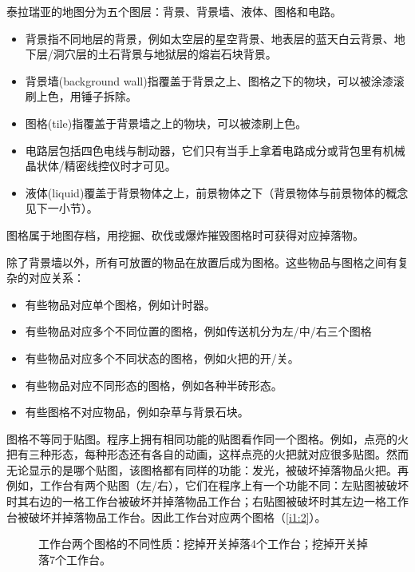 泰拉瑞亚的地图分为五个图层：背景、背景墙、液体、图格和电路。
\begin{itemize}
\item 背景指不同地层的背景，例如太空层的星空背景、地表层的蓝天白云背景、地下层/洞穴层的土石背景与地狱层的熔岩石块背景。
\item 背景墙(background wall)指覆盖于背景之上、图格之下的物块，可以被涂漆滚刷上色，用锤子拆除。
\item 图格(tile)指覆盖于背景墙之上的物块，可以被漆刷上色。
\item 电路层包括四色电线与制动器，它们只有当手上拿着电路成分或背包里有机械晶状体/精密线控仪时才可见。
\item 液体(liquid)覆盖于背景物体之上，前景物体之下（背景物体与前景物体的概念见下一小节）。
\end{itemize}

图格属于地图存档，用挖掘、砍伐或爆炸摧毁图格时可获得对应掉落物。

除了背景墙以外，所有可放置的物品在放置后成为图格。这些物品与图格之间有复杂的对应关系：
\begin{itemize}
\item 有些物品对应单个图格，例如计时器。
\item 有些物品对应多个不同位置的图格，例如传送机分为左/中/右三个图格
\item 有些物品对应多个不同状态的图格，例如火把的开/关。
\item 有些物品对应不同形态的图格，例如各种半砖形态。
\item 有些图格不对应物品，例如杂草与背景石块。
\end{itemize}
图格不等同于贴图。程序上拥有相同功能的贴图看作同一个图格。例如，点亮的火把有三种形态，每种形态还有各自的动画，这样点亮的火把就对应很多贴图。然而无论显示的是哪个贴图，该图格都有同样的功能：发光，被破坏掉落物品火把。再例如，工作台有两个贴图（左/右），它们在程序上有一个功能不同：左贴图被破坏时其右边的一格工作台被破坏并掉落物品工作台；右贴图被破坏时其左边一格工作台被破坏并掉落物品工作台。因此工作台对应两个图格（\autoref{i1:2}）。

\begin{figure}

\centering
{}
\caption{工作台两个图格的不同性质：\protect{}挖掉开关掉落4个工作台；\protect{}挖掉开关掉落7个工作台。}
\label{i1:2}
\end{figure}

